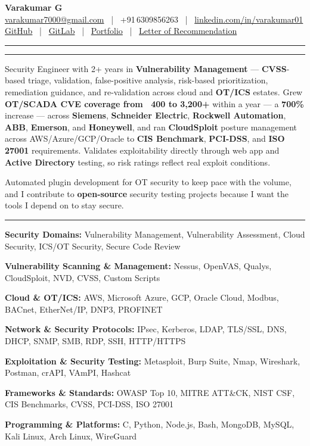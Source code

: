 \documentclass[9pt,a4paper]{extarticle}
\newcommand{\resumeSection}[1]{%
  \vspace{5pt}%
  \noindent{\large\bfseries\MakeUppercase{#1}}\par%
  \vspace{-7pt}%
  \noindent\rule{\textwidth}{0.5pt}%
  \par\vspace{0pt}%
}
\newcommand{\techrow}[2]{\noindent\textbf{#1} #2\par}
\begin{document}

\vspace*{-8pt}
\begin{center}
  {\LARGE\bfseries Varakumar G}\\[2pt]
  \href{mailto:varakumar7000@gmail.com}{varakumar7000@gmail.com}
  ~|~ +91\,6309856263
  ~|~ \href{https://www.linkedin.com/in/varakumar01}{linkedin.com/in/varakumar01}\\[1pt]
  \href{https://github.com/varakumar01}{GitHub}
  ~|~ \href{https://gitlab.com/Tony_01}{GitLab}
  ~|~ \href{https://portfolio.dragnux.com}{Portfolio}
  ~|~ \href{https://drive.google.com/file/d/17c5RtAgWn5TdRQUxnDIvLQogPoUoxgO_/view?pli=1}{Letter of Recommendation}
\end{center}
\vspace{-1pt}\noindent\rule{\textwidth}{0.7pt}

\resumeSection{Professional Summary}

Security Engineer with 2+ years in \textbf{Vulnerability Management} — \textbf{CVSS}-based triage, validation, false-positive analysis, risk-based prioritization, remediation guidance, and re-validation across cloud and \textbf{OT/ICS} estates. Grew \textbf{OT/SCADA CVE coverage from ~400 to 3,200+} within a year — a \textbf{700\%} increase — across \textbf{Siemens}, \textbf{Schneider Electric}, \textbf{Rockwell Automation}, \textbf{ABB}, \textbf{Emerson}, and \textbf{Honeywell}, and ran \textbf{CloudSploit} posture management across AWS/Azure/GCP/Oracle to \textbf{CIS Benchmark}, \textbf{PCI-DSS}, and \textbf{ISO 27001} requirements. Validates exploitability directly through web app and \textbf{Active Directory} testing, so risk ratings reflect real exploit conditions.

Automated plugin development for OT security to keep pace with the volume, and I contribute to \textbf{open-source} security testing projects because I want the tools I depend on to stay secure.

\resumeSection{Technical Skills}

\techrow{Security Domains:}{Vulnerability Management, Vulnerability Assessment, Cloud Security, ICS/OT Security, Secure Code Review}
\techrow{Vulnerability Scanning \& Management:}{Nessus, OpenVAS, Qualys, CloudSploit, NVD, CVSS, Custom Scripts}
\techrow{Cloud \& OT/ICS:}{AWS, Microsoft Azure, GCP, Oracle Cloud, Modbus, BACnet, EtherNet/IP, DNP3, PROFINET}
\techrow{Network \& Security Protocols:}{IPsec, Kerberos, LDAP, TLS/SSL, DNS, DHCP, SNMP, SMB, RDP, SSH, HTTP/HTTPS}
\techrow{Exploitation \& Security Testing:}{Metasploit, Burp Suite, Nmap, Wireshark, Postman, crAPI, VAmPI, Hashcat}
\techrow{Frameworks \& Standards:}{OWASP Top 10, MITRE ATT\&CK, NIST CSF, CIS Benchmarks, CVSS, PCI-DSS, ISO 27001}
\techrow{Programming \& Platforms:}{C, Python, Node.js, Bash, MongoDB, MySQL, Kali Linux, Arch Linux, WireGuard}
\end{document}
